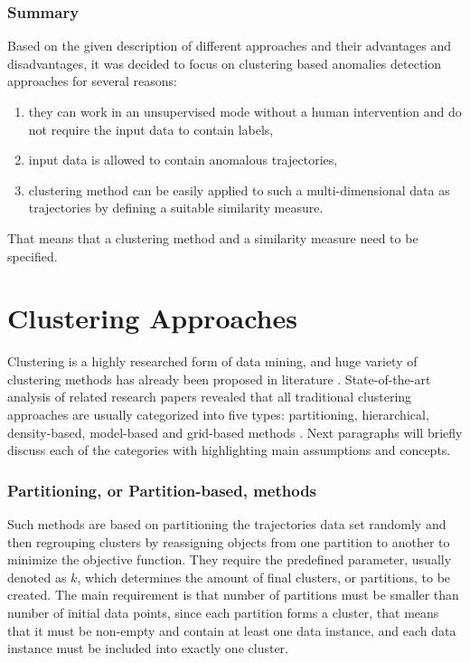 \subsubsection{Summary}
Based on the given description of different approaches and their advantages and disadvantages, it was decided to focus on clustering based anomalies detection approaches for several reasons: 
\begin{enumerate}[label=\arabic*)]
	\item they can work in an unsupervised mode without a human intervention and do not require the input data to contain labels,
	\item input data is allowed to contain anomalous trajectories,
	\item clustering method can be easily applied to such a multi-dimensional data as trajectories by defining a suitable similarity measure.
\end{enumerate}

That means that a clustering method and a similarity measure need to be specified.

\section{Clustering Approaches}
Clustering is a highly researched form of data mining, and huge variety of clustering methods has already been proposed in literature \cite{article:8_review_mot_cl_alg}. State-of-the-art analysis of related research papers revealed that all traditional clustering approaches are usually categorized into five types: partitioning, hierarchical, density-based, model-based and grid-based methods \cite{article:5_survey_tbsa}\cite{article:8_review_mot_cl_alg}. Next paragraphs will briefly discuss each of the categories with highlighting main assumptions and concepts.

\subsubsection{Partitioning, or Partition-based, methods}
Such methods are based on partitioning the trajectories data set randomly and then regrouping clusters by reassigning objects from one partition to another to minimize the objective function. They require the predefined parameter, usually denoted as $k$, which determines the amount of final clusters, or partitions, to be created. The main requirement is that number of partitions must be smaller than number of initial data points, since each partition forms a cluster, that means that it must be non-empty and contain at least one data instance, and each data instance must be included into exactly one cluster.

